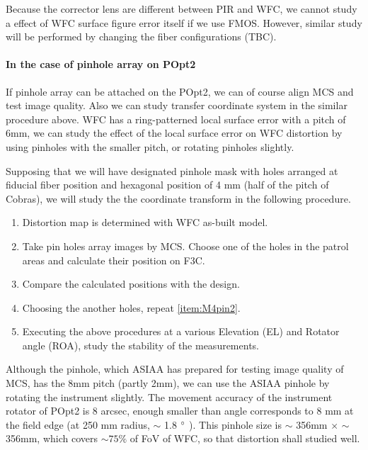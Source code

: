 Because the corrector lens are different between PIR and WFC, we cannot study a effect of WFC surface figure error itself if we use FMOS.
However, similar study will be performed by changing the fiber configurations (TBC).

\paragraph{In the case of pinhole array on POpt2}
If pinhole array can be attached on the POpt2, we can of course align MCS and test image quality.
Also we can study transfer coordinate system in the similar procedure above.
WFC has a ring-patterned local surface error with a pitch of 6mm, we can study the effect of the local surface error on WFC distortion by using pinholes with the smaller pitch, or rotating pinholes slightly.

Supposing that we will have designated pinhole mask with holes arranged at fiducial fiber position and hexagonal position of 4 mm (half of the pitch of  Cobras), we will study the the coordinate transform in the following procedure.
\begin{enumerate}
\item Distortion map is determined with WFC as-built model.
\item \label{item:M4pin2} Take pin holes array images by MCS.
Choose one of the holes in the patrol areas and calculate their position on F3C.
\item Compare the calculated positions with the design.
\item Choosing the another holes, repeat \ref{item:M4pin2}.
\item Executing the above procedures at a various Elevation (EL) and Rotator angle (ROA), study the stability of the measurements.
\end{enumerate}

Although the pinhole, which ASIAA has prepared for testing image quality of MCS, has the 8mm pitch (partly 2mm), we can use the ASIAA pinhole by rotating the instrument slightly.
The movement accuracy of the instrument rotator of POpt2 is 8 arcsec, enough smaller than angle corresponds to 8 mm at the field edge (at 250 mm radius, $\sim$ 1.8 $^\circ$ ).
This pinhole size is $\sim$ 356mm $\times$ $\sim$ 356mm, which covers $\sim 75\%$ of FoV of WFC, so that distortion shall studied well.

